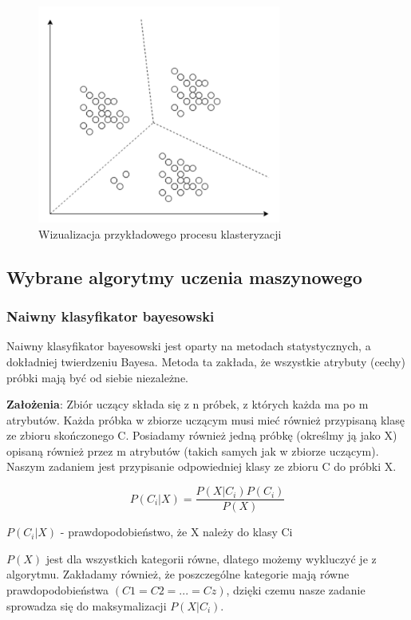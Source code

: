\begin{enumerate}
    \begin{figure}[H]
    \includegraphics[width=8cm]{clustering_example.png}
    \centering
    \caption{Wizualizacja przykładowego procesu klasteryzacji}
    \end{figure}
    
\end{enumerate}

\subsection{Wybrane algorytmy uczenia maszynowego}

\subsubsection{Naiwny klasyfikator bayesowski}

Naiwny klasyfikator bayesowski jest oparty na metodach statystycznych, a dokładniej twierdzeniu Bayesa. Metoda ta zakłada, że wszystkie atrybuty (cechy) próbki mają być od siebie niezależne.

\textbf{Założenia}: Zbiór uczący składa się z n próbek, z których każda ma po m atrybutów. Każda próbka w zbiorze uczącym musi mieć również przypisaną klasę ze zbioru skończonego C. Posiadamy również jedną próbkę (określmy ją jako X) opisaną również przez m atrybutów (takich samych jak w zbiorze uczącym). Naszym zadaniem jest przypisanie odpowiedniej klasy ze zbioru C do próbki X.

\[ P(C_i|X) = \frac{P(X|C_i)P(C_i)}{P(X)} \]

\begin{center}
    $P(C_i|X)$ - prawdopodobieństwo, że X należy do klasy Ci
\end{center}

$P(X)$ jest dla wszystkich kategorii równe, dlatego możemy wykluczyć je z algorytmu.
Zakładamy również, że poszczególne kategorie mają równe prawdopodobieństwa 
$(C1 = C2 = ... = Cz)$, dzięki czemu nasze zadanie sprowadza się do maksymalizacji $P(X|C_i)$.

